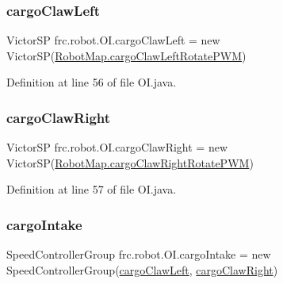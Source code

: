 \subsubsection{\texorpdfstring{cargo\+Claw\+Left}{cargoClawLeft}}
{\footnotesize\ttfamily Victor\+SP frc.\+robot.\+O\+I.\+cargo\+Claw\+Left = new Victor\+SP(\hyperlink{classfrc_1_1robot_1_1_robot_map_aa5824f279bf68bbd68ae1ea3087c4b67}{Robot\+Map.\+cargo\+Claw\+Left\+Rotate\+P\+WM})\hspace{0.3cm}{\ttfamily [static]}}



Definition at line 56 of file O\+I.\+java.

\mbox{\label{classfrc_1_1robot_1_1_o_i_a32fd81c9a712924aa42a9eb74f278df1}} 
\subsubsection{\texorpdfstring{cargo\+Claw\+Right}{cargoClawRight}}
{\footnotesize\ttfamily Victor\+SP frc.\+robot.\+O\+I.\+cargo\+Claw\+Right = new Victor\+SP(\hyperlink{classfrc_1_1robot_1_1_robot_map_a108c3b97c541e7ed5a152cea66981231}{Robot\+Map.\+cargo\+Claw\+Right\+Rotate\+P\+WM})\hspace{0.3cm}{\ttfamily [static]}}



Definition at line 57 of file O\+I.\+java.

\mbox{\label{classfrc_1_1robot_1_1_o_i_a40d2adcc988805032885ba668fc6f86f}} 
\subsubsection{\texorpdfstring{cargo\+Intake}{cargoIntake}}
{\footnotesize\ttfamily Speed\+Controller\+Group frc.\+robot.\+O\+I.\+cargo\+Intake = new Speed\+Controller\+Group(\hyperlink{classfrc_1_1robot_1_1_o_i_a7ec725773fd1bb5dc4263980a232e75f}{cargo\+Claw\+Left}, \hyperlink{classfrc_1_1robot_1_1_o_i_a32fd81c9a712924aa42a9eb74f278df1}{cargo\+Claw\+Right})\hspace{0.3cm}{\ttfamily [static]}}



